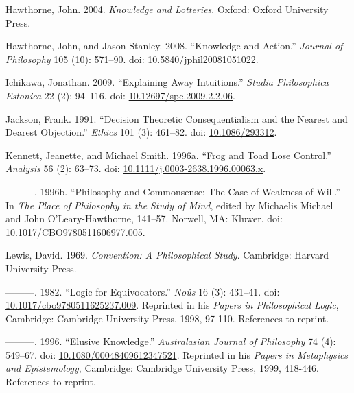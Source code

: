 \documentclass[
  10pt,
  letterpaper,
  DIV=11,
  numbers=noendperiod,
  twoside]{scrartcl}
\newlength{\cslhangindent}
\newenvironment{CSLReferences}[2] %
 {\begin{list}{}{%
  \setlength{\itemindent}{0pt}
  \setlength{\leftmargin}{0pt}
  \setlength{\parsep}{0pt}
  \ifodd #1
   \setlength{\leftmargin}{\cslhangindent}
   \setlength{\itemindent}{-1\cslhangindent}
  \fi
  \setlength{\itemsep}{#2\baselineskip}}}
 {\end{list}}
\begin{document}
\begin{CSLReferences}{1}{0}
Hawthorne, John. 2004. \emph{Knowledge and Lotteries}. Oxford: Oxford
University Press.

Hawthorne, John, and Jason Stanley. 2008. {``{Knowledge and Action}.''}
\emph{Journal of Philosophy} 105 (10): 571--90. doi:
\href{https://doi.org/10.5840/jphil20081051022}{10.5840/jphil20081051022}.

Ichikawa, Jonathan. 2009. {``Explaining Away Intuitions.''} \emph{Studia
Philosophica Estonica} 22 (2): 94--116. doi:
\href{https://doi.org/10.12697/spe.2009.2.2.06}{10.12697/spe.2009.2.2.06}.

Jackson, Frank. 1991. {``Decision Theoretic Consequentialism and the
Nearest and Dearest Objection.''} \emph{Ethics} 101 (3): 461--82. doi:
\href{https://doi.org/10.1086/293312}{10.1086/293312}.

Kennett, Jeanette, and Michael Smith. 1996a. {``Frog and Toad Lose
Control.''} \emph{Analysis} 56 (2): 63--73. doi:
\href{https://doi.org/10.1111/j.0003-2638.1996.00063.x}{10.1111/j.0003-2638.1996.00063.x}.

---------. 1996b. {``Philosophy and Commonsense: The Case of Weakness of
Will.''} In \emph{The Place of Philosophy in the Study of Mind}, edited
by Michaelis Michael and John O'Leary-Hawthorne, 141--57. Norwell, MA:
Kluwer. doi:
\href{https://doi.org/10.1017/CBO9780511606977.005}{10.1017/CBO9780511606977.005}.

Lewis, David. 1969. \emph{Convention: A Philosophical Study}. Cambridge:
Harvard University Press.

---------. 1982. {``Logic for Equivocators.''} \emph{No{û}s} 16 (3):
431--41. doi:
\href{https://doi.org/10.1017/cbo9780511625237.009}{10.1017/cbo9780511625237.009}.
Reprinted in his \emph{Papers in Philosophical Logic}, Cambridge:
Cambridge University Press, 1998, 97-110. References to reprint.

---------. 1996. {``Elusive Knowledge.''} \emph{Australasian Journal of
Philosophy} 74 (4): 549--67. doi:
\href{https://doi.org/10.1080/00048409612347521}{10.1080/00048409612347521}.
Reprinted in his \emph{Papers in Metaphysics and Epistemology},
Cambridge: Cambridge University Press, 1999, 418-446. References to
reprint.


\end{CSLReferences}
\end{document}

